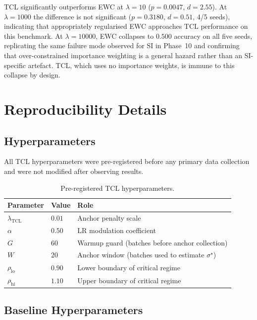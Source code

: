 \documentclass[10pt,a4paper]{article}
\begin{document}
TCL significantly outperforms EWC at $\lambda = 10$ ($p = 0.0047$, $d = 2.55$).
At $\lambda = 1000$ the difference is not significant ($p = 0.3180$, $d = 0.51$,
4/5 seeds), indicating that appropriately regularised EWC approaches TCL performance
on this benchmark. At $\lambda = 10000$, EWC collapses to $0.500$ accuracy on all
five seeds, replicating the same failure mode observed for SI in Phase~10 and
confirming that over-constrained importance weighting is a general hazard rather than
an SI-specific artefact. TCL, which uses no importance weights, is immune to this
collapse by design.

\section{Reproducibility Details}
\label{app:reproducibility}

\subsection{Hyperparameters}

All TCL hyperparameters were pre-registered before any primary data collection and
were not modified after observing results.

\begin{table}[h]
\centering
\caption{Pre-registered TCL hyperparameters.}
\label{tab:hyperparams}
\begin{tabular}{lll}
\toprule
Parameter & Value & Role \\
\midrule
$\lambda_\text{TCL}$ & $0.01$ & Anchor penalty scale \\
$\alpha$             & $0.50$ & LR modulation coefficient \\
$G$                  & $60$   & Warmup guard (batches before anchor collection) \\
$W$                  & $20$   & Anchor window (batches used to estimate $\sigma^\star$) \\
$\rho_\text{lo}$     & $0.90$ & Lower boundary of critical regime \\
$\rho_\text{hi}$     & $1.10$ & Upper boundary of critical regime \\
\bottomrule
\end{tabular}
\end{table}

\subsection{Baseline Hyperparameters}
\end{document}
